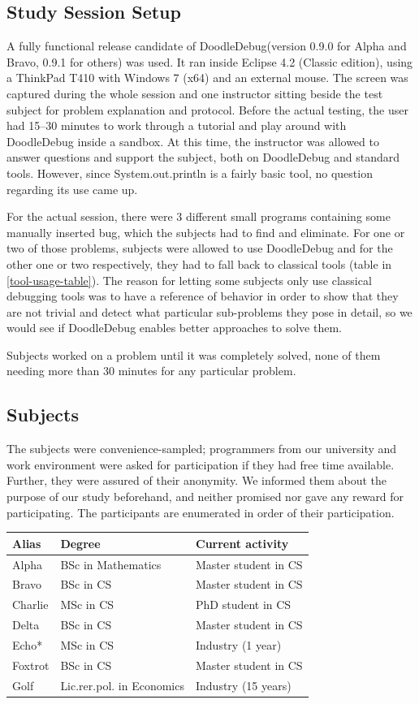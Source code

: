 \documentclass[english]{scrartcl}
\newcommand{\DD}{Dood\-le\-De\-bug\xspace}
\begin{document}
\subsection{Study Session Setup}
A fully functional release candidate of \DD (version 0.9.0 for Alpha and Bravo, 0.9.1 for others) was used.
It ran inside Eclipse 4.2 (Classic edition), using a ThinkPad T410 with Windows 7 (x64) and an external mouse.
The screen was captured during the whole session and one instructor sitting beside the test subject for problem explanation and protocol.
Before the actual testing, the user had 15--30 minutes to work through a tutorial and play around with \DD inside a sandbox.
At this time, the instructor was allowed to answer questions and support the subject, both on \DD and standard tools.
However, since System.out.println is a fairly basic tool, no question regarding its use came up.

For the actual session, there were 3 different small programs containing some manually inserted bug, which the subjects had to find and eliminate.
For one or two of those problems, subjects were allowed to use \DD and for the other one or two respectively, they had to fall back to classical tools (table in \ref{tool-usage-table}).
The reason for letting some subjects only use classical debugging tools was to have a reference of behavior in order to show that they are not trivial and detect what particular sub-problems they pose in detail, so we would see if \DD enables better approaches to solve them.

Subjects worked on a problem until it was completely solved, none of them needing more than 30 minutes for any particular problem.

\subsection{Subjects}
The subjects were convenience-sampled; programmers from our university and work environment were asked for participation if they had free time available. Further, they were assured of their anonymity. We informed them about the purpose of our study beforehand, and neither promised nor gave any reward for participating. The participants are enumerated in order of their participation.

\begin{tabular}{l | l | l}
Alias & Degree & Current activity \\
\hline
Alpha & BSc in Mathematics & Master student in CS  \\
Bravo & BSc in CS & Master student in CS \\
Charlie & MSc in CS & PhD student in CS \\
Delta & BSc in CS & Master student in CS \\
Echo* & MSc in CS & Industry (1 year)\\
Foxtrot & BSc in CS & Master student in CS \\
Golf & Lic.rer.pol. in Economics & Industry (15 years)\\
\end{tabular}
\end{document}
